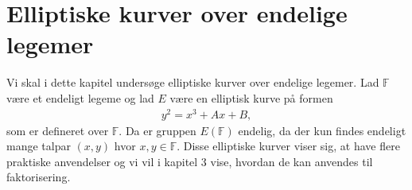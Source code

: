 \chapter{Elliptiske kurver over endelige legemer}

Vi skal i dette kapitel undersøge elliptiske kurver over endelige legemer. 
Lad $\mathbb{F}$ være et endeligt legeme og lad $E$ være en elliptisk kurve på
formen 
\begin{align*}
	y^2 = x^3 + Ax + B,
\end{align*}
som er defineret over $\mathbb{F}$. Da er gruppen $E(\mathbb{F})$ endelig, da 
der kun findes endeligt mange talpar $(x, y)$ hvor $x, y \in \mathbb{F}$. Disse 
elliptiske kurver viser sig, at have flere praktiske anvendelser og vi vil i kapitel
3 vise, hvordan de kan anvendes til faktorisering.